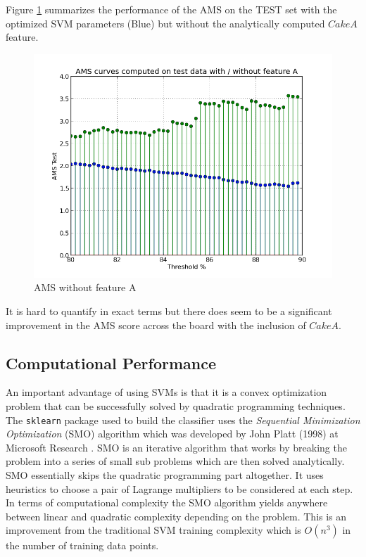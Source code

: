 \documentclass[final,3p,times,twocolumn]{elsarticle}
\begin{document}
Figure \ref{AMSNoA} summarizes the performance of the AMS on the TEST set with the optimized SVM parameters (Blue) but without the analytically computed $CakeA$ feature.

\begin{figure}
\includegraphics[scale=0.4]{Images/AMS_NO_A.png}
\caption{AMS without feature A}
\label{AMSNoA}
\end{figure}

It is hard to quantify in exact terms but there does seem to be a significant improvement in the AMS score across the board with the inclusion of $CakeA$. 


\subsection{Computational Performance}

An important advantage of using SVMs is that it is a convex optimization problem that can be successfully solved by quadratic programming techniques. The \texttt{sklearn} package used to build the classifier uses the \textit{Sequential Minimization Optimization} (SMO) algorithm which was developed by John Platt (1998) at Microsoft Research \cite{SMO}. SMO is an iterative algorithm that works by breaking the problem into a series of small sub problems which are then solved analytically. SMO essentially skips the quadratic programming part altogether. It uses heuristics to choose a pair of Lagrange multipliers to be considered at each step. In terms of computational complexity the SMO algorithm yields anywhere between linear and quadratic complexity depending on the problem. This is an improvement from the traditional SVM training complexity which is $O(n^3)$ in the number of  training data points. 
\end{document}
